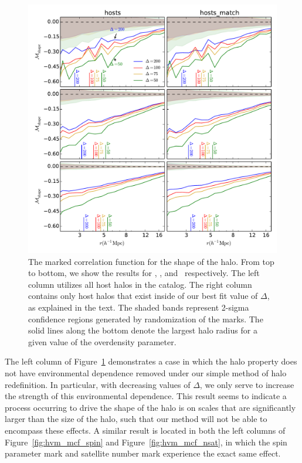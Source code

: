 \documentclass[usenatbib,usegraphicx,letterpaper]{mn2e}
\begin{document}
\begin{figure}
	\centering
	\includegraphics[width=\textwidth]{all_mcf_s_z00_hostsvmatch.pdf}
	\caption{The marked correlation function for the shape of the halo. From top to bottom, we show the results for \simA, \simB, and \simC \ respectively. The left column utilizes all host halos in the catalog. The right column contains only host halos that exist inside of our best fit value of $\Delta$, as explained in the text. The shaded bands represent 2-sigma confidence regions generated by randomization of the marks. The solid lines along the bottom denote the largest halo radius for a given value of the overdensity parameter.}
	\label{fig:hvm_mcf_s}
\end{figure}

The left column of Figure~\ref{fig:hvm_mcf_s} demonstrates a case in which the halo property does not have environmental dependence removed under our simple method of halo redefinition. In particular, with decreasing values of $\Delta$, we only serve to increase the strength of this environmental dependence. This result seems to indicate a process occurring to drive the shape of the halo is on scales that are significantly larger than the size of the halo, such that our method will not be able to encompass these effects. A similar result is located in both the left columns of Figure~\ref{fig:hvm_mcf_spin} and Figure~\ref{fig:hvm_mcf_nsat}, in which the spin parameter mark and satellite number mark experience the exact same effect.
\end{document}
